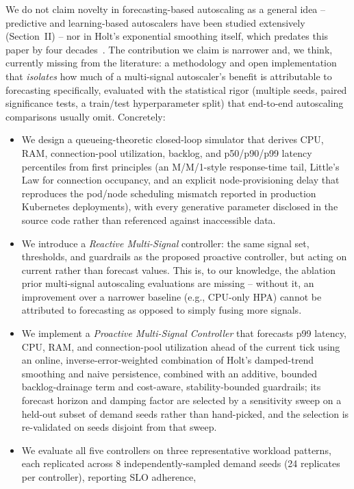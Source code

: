 \documentclass[conference]{IEEEtran}
\begin{document}
We do not claim novelty in forecasting-based autoscaling as a general idea -- predictive and
learning-based autoscalers have been studied extensively (Section~II) -- nor in Holt's exponential
smoothing itself, which predates this paper by four decades~\cite{gardner1985}. The contribution we
claim is narrower and, we think, currently missing from the literature: a methodology and open
implementation that \emph{isolates} how much of a multi-signal autoscaler's benefit is attributable to
forecasting specifically, evaluated with the statistical rigor (multiple seeds, paired significance
tests, a train/test hyperparameter split) that end-to-end autoscaling comparisons usually omit.
Concretely:
\begin{itemize}
  \item We design a queueing-theoretic closed-loop simulator that derives CPU, RAM, connection-pool
  utilization, backlog, and p50/p90/p99 latency percentiles from first principles (an M/M/1-style
  response-time tail, Little's Law for connection occupancy, and an explicit node-provisioning delay
  that reproduces the pod/node scheduling mismatch reported in production Kubernetes deployments), with
  every generative parameter disclosed in the source code rather than referenced against inaccessible
  data.
  \item We introduce a \emph{Reactive Multi-Signal} controller: the same signal set, thresholds, and
  guardrails as the proposed proactive controller, but acting on current rather than forecast values.
  This is, to our knowledge, the ablation prior multi-signal autoscaling evaluations are missing --
  without it, an improvement over a narrower baseline (e.g., CPU-only HPA) cannot be attributed to
  forecasting as opposed to simply fusing more signals.
  \item We implement a \emph{Proactive Multi-Signal Controller} that forecasts p99 latency, CPU, RAM,
  and connection-pool utilization ahead of the current tick using an online, inverse-error-weighted
  combination of Holt's damped-trend smoothing and naive persistence, combined with an additive,
  bounded backlog-drainage term and cost-aware, stability-bounded guardrails; its forecast horizon and
  damping factor are selected by a sensitivity sweep on a held-out subset of demand seeds rather than
  hand-picked, and the selection is re-validated on seeds disjoint from that sweep.
  \item We evaluate all five controllers on three representative workload patterns, each replicated
  across 8 independently-sampled demand seeds (24 replicates per controller), reporting SLO adherence,

\end{itemize}
\end{document}
